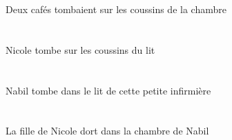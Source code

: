 \begin{exe}
Deux cafés tombaient sur les coussins de la chambre
\ex\glll
\INDSgAbs{}   \NicoleBSgAbs{}    \DEFPlObl{}    \DEFSgObl{}   \litDSgObl{}   \DE{}   \coussinBPlObl{}   \SUR{}  \tomberViPrsBSg{}\\
\INDSgAbsP{}   \NicoleBSgAbsP{}    \DEFPlOblP{}    \DEFSgOblP{}   \litDSgOblP{}   \DEP{}   \coussinBPlOblP{}   \SURP{}  \tomberViPrsBSgP{}\\
\INDSgAbsG{}   \NicoleBSgAbsG{}    \DEFPlOblG{}    \DEFSgOblG{}   \litDSgOblG{}   \DEG{}   \coussinBPlOblG{}   \SURG{}  \tomberViPrsBSgG{}\\
Nicole tombe sur les coussins du lit
\ex\glll
\INDSgAbs{}   \NabilDSgAbs{}    \DEFSgObl{}    \DEMSgObl{}   \petitASg{}   \infirmiereASgObl{}   \DE{}   \litDSgObl{}   \DANS{}  \tomberViPrsDSg{}\\
\INDSgAbsP{}   \NabilDSgAbsP{}    \DEFSgOblP{}    \DEMSgOblP{}   \petitASgP{}   \infirmiereASgOblP{}   \DEP{}   \litDSgOblP{}   \DANSP{}  \tomberViPrsDSgP{}\\
\INDSgAbsG{}   \NabilDSgAbsG{}    \DEFSgOblG{}    \DEMSgOblG{}   \petitASgG{}   \infirmiereASgOblG{}   \DEG{}   \litDSgOblG{}   \DANSG{}  \tomberViPrsDSgG{}\\
Nabil tombe dans le lit de cette petite infirmière
\ex\glll
\DEFSgAbs{}    \INDSgObl{}   \NicoleBSgObl{}   \DE{}   \filleCSgAbs{}    \DEFSgObl{}    \INDSgObl{}   \NabilDSgObl{}   \DE{}   \chambreBSgObl{}   \DANS{}  \dormirViPrsCSg{}\\
\DEFSgAbsP{}    \INDSgOblP{}   \NicoleBSgOblP{}   \DEP{}   \filleCSgAbsP{}    \DEFSgOblP{}    \INDSgOblP{}   \NabilDSgOblP{}   \DEP{}   \chambreBSgOblP{}   \DANSP{}  \dormirViPrsCSgP{}\\
\DEFSgAbsG{}    \INDSgOblG{}   \NicoleBSgOblG{}   \DEG{}   \filleCSgAbsG{}    \DEFSgOblG{}    \INDSgOblG{}   \NabilDSgOblG{}   \DEG{}   \chambreBSgOblG{}   \DANSG{}  \dormirViPrsCSgG{}\\
La fille de Nicole dort dans la chambre de Nabil
\ex\glll
\DEFPlErg{}   \infirmiereAPlErg{}    \DEFDuDat{}    \INDPlObl{}   \sourisBPlObl{}   \DE{}   \chasseurCDuDat{}   \INDSgAbs{}   \cafeCSgAbs{}  \offrirVdPstCSg{}\\
\DEFPlErgP{}   \infirmiereAPlErgP{}    \DEFDuDatP{}    \INDPlOblP{}   \sourisBPlOblP{}   \DEP{}   \chasseurCDuDatP{}   \INDSgAbsP{}   \cafeCSgAbsP{}  \offrirVdPstCSgP{}\\
\DEFPlErgG{}   \infirmiereAPlErgG{}    \DEFDuDatG{}    \INDPlOblG{}   \sourisBPlOblG{}   \DEG{}   \chasseurCDuDatG{}   \INDSgAbsG{}   \cafeCSgAbsG{}  \offrirVdPstCSgG{}\\

\end{exe}
